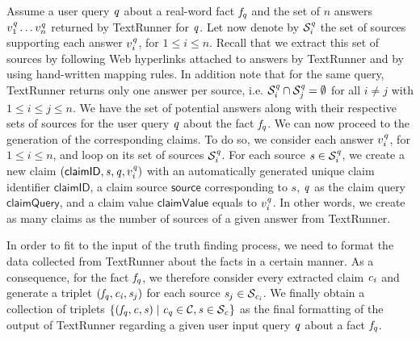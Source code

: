 Assume a user query $\mathit{q}$ about a real-word fact $\mathit{f}_{\mathit{q}}$ and the set of $n$ answers $v_1^{\mathit{q}}\ldots v_n^{\mathit{q}}$
returned by TextRunner for $\mathit{q}$. Let now denote by $\mathcal{S}_{i}^{\mathit{q}}$ the set of sources supporting each answer $v_i^{\mathit{q}}$,
for $1\leq i\leq n$. Recall that we extract this set of sources by following Web hyperlinks attached to answers by TextRunner and by 
using hand-written mapping rules. In addition note that for the same query, TextRunner returns only one answer per source, i.e. $\mathcal{S}_{i}^{\mathit{q}}
\cap \mathcal{S}_{j}^{\mathit{q}}=\emptyset$ for all $i\neq j$ with $1\leq i\leq j\leq n$. We have the set of potential answers along with their
respective sets of sources for the user query $\mathit{q}$ about the fact $\mathit{f}_{\mathit{q}}$. We can now proceed to the generation of the corresponding claims.
To do so, we consider each answer $v_i^{\mathit{q}}$, for $1\leq i\leq n$, and loop on its set of sources $\mathcal{S}_{i}^{\mathit{q}}$. For each source 
$\mathit{s}_{} \in \mathcal{S}_{i}^{\mathit{q}}$, we create a new claim $(\textsf{claimID}, \mathit{s}_{}, \mathit{q}, v_i^{\mathit{q}})$ with an automatically generated unique claim 
identifier $\textsf{claimID}$, a claim source $\textsf{source}$ corresponding to $s$,  $\mathit{q}$ as the claim query $\textsf{claimQuery}$, and a claim value $\textsf{claimValue}$ equals 
to  $v_i^{\mathit{q}}$. In other words, we create as many claims as the number of sources of a given answer from TextRunner.

In order to fit to 
the input of the truth finding process, we need to format the data collected from TextRunner about the 
facts in a certain manner. As a consequence, for the fact $\mathit{f}_{\mathit{q}}$, we therefore consider every extracted 
claim $\mathit{c_{i}}$ and generate a triplet $(\mathit{f}_{\mathit{q}}, \mathit{c_{i}}, \mathit{s}_{j})$ for each source $\mathit{s}_{j}\in \mathcal{S}_{\mathit{c_{i}}}$.
We finally obtain a collection of triplets $\{(\mathit{f}_{\mathit{q}}, \mathit{c_{}}, \mathit{s}_{})\mid \mathit{c_{\mathit{q}}}\in \mathcal{C}, \mathit{s}_{} \in \mathcal{S}_{\mathit{c_{}}}\}$ 
as the final formatting of the output of TextRunner regarding a given user input query $\mathit{q}$ about a fact $\mathit{f}_{\mathit{q}}$. 



